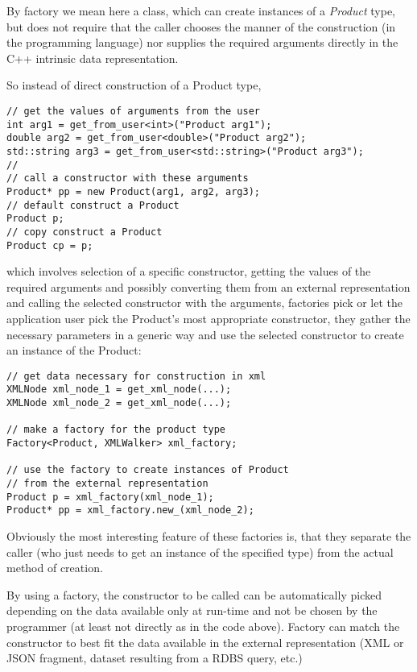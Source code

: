 By factory we mean here a class, which can create
instances of a {\em Product} type, but does not require that
the caller chooses the manner of the construction (in the programming
language) nor supplies the required arguments directly
in the C++ intrinsic data representation.

So instead of direct construction of a Product type,

\begin{lstlisting}
// get the values of arguments from the user
int arg1 = get_from_user<int>("Product arg1");
double arg2 = get_from_user<double>("Product arg2");
std::string arg3 = get_from_user<std::string>("Product arg3");
//
// call a constructor with these arguments
Product* pp = new Product(arg1, arg2, arg3);
// default construct a Product
Product p;
// copy construct a Product
Product cp = p;
\end{lstlisting}

which involves selection of a specific constructor, getting
the values of the required arguments and possibly converting 
them from an external representation and calling the selected
constructor with the arguments, 
factories pick or let the application user pick the Product's most
appropriate constructor, they gather the necessary parameters
in a generic way and use the selected constructor to create
an instance of the Product:

\begin{lstlisting}
// get data necessary for construction in xml
XMLNode xml_node_1 = get_xml_node(...);
XMLNode xml_node_2 = get_xml_node(...);

// make a factory for the product type
Factory<Product, XMLWalker> xml_factory;

// use the factory to create instances of Product
// from the external representation
Product p = xml_factory(xml_node_1);
Product* pp = xml_factory.new_(xml_node_2);
\end{lstlisting}

Obviously the most interesting feature of these factories is,
that they separate the caller (who just needs to get an instance
of the specified type) from the actual method of creation.

By using a factory, the constructor to be called can 
be automatically picked depending on the data available only at run-time
and not be chosen by the programmer (at least not directly
as in the code above). Factory can match
the constructor to best fit the data available in the external
representation (XML or JSON fragment, dataset resulting from a
RDBS query, etc.)

